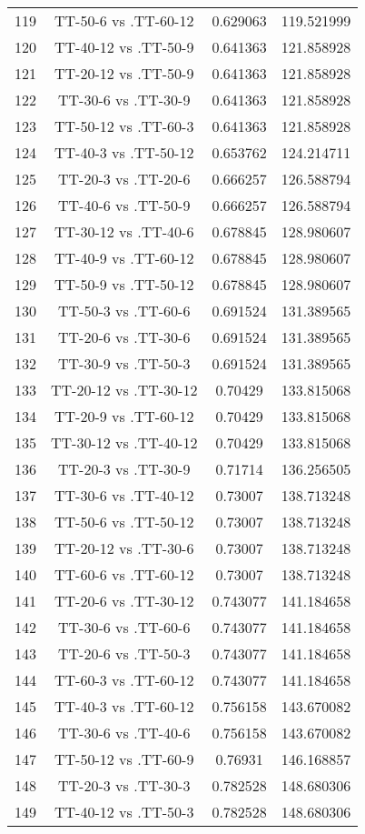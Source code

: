 \documentclass[a4paper,10pt]{article}
\begin{document}
\begin{landscape}
\begin{table}[!htp]
\begin{tabular}{cccc}
119&TT-50-6 vs .TT-60-12&0.629063&119.521999\\
120&TT-40-12 vs .TT-50-9&0.641363&121.858928\\
121&TT-20-12 vs .TT-50-9&0.641363&121.858928\\
122&TT-30-6 vs .TT-30-9&0.641363&121.858928\\
123&TT-50-12 vs .TT-60-3&0.641363&121.858928\\
124&TT-40-3 vs .TT-50-12&0.653762&124.214711\\
125&TT-20-3 vs .TT-20-6&0.666257&126.588794\\
126&TT-40-6 vs .TT-50-9&0.666257&126.588794\\
127&TT-30-12 vs .TT-40-6&0.678845&128.980607\\
128&TT-40-9 vs .TT-60-12&0.678845&128.980607\\
129&TT-50-9 vs .TT-50-12&0.678845&128.980607\\
130&TT-50-3 vs .TT-60-6&0.691524&131.389565\\
131&TT-20-6 vs .TT-30-6&0.691524&131.389565\\
132&TT-30-9 vs .TT-50-3&0.691524&131.389565\\
133&TT-20-12 vs .TT-30-12&0.70429&133.815068\\
134&TT-20-9 vs .TT-60-12&0.70429&133.815068\\
135&TT-30-12 vs .TT-40-12&0.70429&133.815068\\
136&TT-20-3 vs .TT-30-9&0.71714&136.256505\\
137&TT-30-6 vs .TT-40-12&0.73007&138.713248\\
138&TT-50-6 vs .TT-50-12&0.73007&138.713248\\
139&TT-20-12 vs .TT-30-6&0.73007&138.713248\\
140&TT-60-6 vs .TT-60-12&0.73007&138.713248\\
141&TT-20-6 vs .TT-30-12&0.743077&141.184658\\
142&TT-30-6 vs .TT-60-6&0.743077&141.184658\\
143&TT-20-6 vs .TT-50-3&0.743077&141.184658\\
144&TT-60-3 vs .TT-60-12&0.743077&141.184658\\
145&TT-40-3 vs .TT-60-12&0.756158&143.670082\\
146&TT-30-6 vs .TT-40-6&0.756158&143.670082\\
147&TT-50-12 vs .TT-60-9&0.76931&146.168857\\
148&TT-20-3 vs .TT-30-3&0.782528&148.680306\\
149&TT-40-12 vs .TT-50-3&0.782528&148.680306\\

\end{tabular}
\end{table}
\end{landscape}
\end{document}
